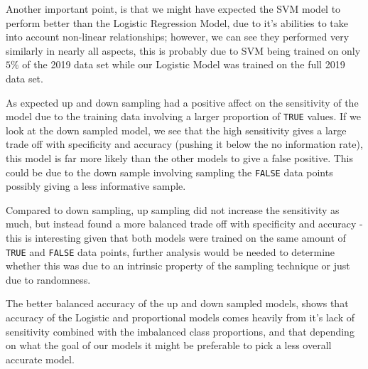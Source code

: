 \documentclass[
]{article}
\begin{document}
Another important point, is that we might have expected the SVM model to
perform better than the Logistic Regression Model, due to it's abilities
to take into account non-linear relationships; however, we can see they
performed very similarly in nearly all aspects, this is probably due to
SVM being trained on only \(5\%\) of the 2019 data set while our
Logistic Model was trained on the full 2019 data set.

As expected up and down sampling had a positive affect on the
sensitivity of the model due to the training data involving a larger
proportion of \texttt{TRUE} values. If we look at the down sampled
model, we see that the high sensitivity gives a large trade off with
specificity and accuracy (pushing it below the no information rate),
this model is far more likely than the other models to give a false
positive. This could be due to the down sample involving sampling the
\texttt{FALSE} data points possibly giving a less informative sample.

Compared to down sampling, up sampling did not increase the sensitivity
as much, but instead found a more balanced trade off with specificity
and accuracy - this is interesting given that both models were trained
on the same amount of \texttt{TRUE} and \texttt{FALSE} data points,
further analysis would be needed to determine whether this was due to an
intrinsic property of the sampling technique or just due to randomness.

The better balanced accuracy of the up and down sampled models, shows
that accuracy of the Logistic and proportional models comes heavily from
it's lack of sensitivity combined with the imbalanced class proportions,
and that depending on what the goal of our models it might be preferable
to pick a less overall accurate model.
\end{document}
